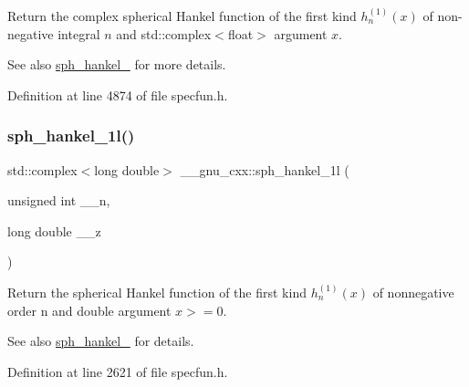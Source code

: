Return the complex spherical Hankel function of the first kind $ h^{(1)}_n(x) $ of non-\/negative integral $ n $ and {\ttfamily std\+::complex$<$float$>$} argument $ x $.

\begin{DoxySeeAlso}{See also}
\hyperlink{group__gnu__math__spec__func_ga4424f565fb224ab88b177beb65d08305}{sph\+\_\+hankel\+\_} for more details. 
\end{DoxySeeAlso}


Definition at line 4874 of file specfun.\+h.

\mbox{\label{group__gnu__math__spec__func_ga6e77fd5cddfbd57d9120b20fc6c30e6f}} 
\subsubsection{\texorpdfstring{sph\+\_\+hankel\+\_\+1l()}{sph\_hankel\_1l()}\hspace{0.1cm}{\footnotesize\ttfamily [1/2]}}
{\footnotesize\ttfamily std\+::complex$<$long double$>$ \+\_\+\+\_\+gnu\+\_\+cxx\+::sph\+\_\+hankel\+\_\+1l (\begin{DoxyParamCaption}\item[{unsigned int}]{\+\_\+\+\_\+n,  }\item[{long double}]{\+\_\+\+\_\+z }\end{DoxyParamCaption})\hspace{0.3cm}{\ttfamily [inline]}}

Return the spherical Hankel function of the first kind $ h^{(1)}_n(x) $ of nonnegative order n and { double} argument $ x >= 0 $.

\begin{DoxySeeAlso}{See also}
\hyperlink{group__gnu__math__spec__func_ga4424f565fb224ab88b177beb65d08305}{sph\+\_\+hankel\+\_} for details. 
\end{DoxySeeAlso}


Definition at line 2621 of file specfun.\+h.

\mbox{\label{group__gnu__math__spec__func_ga3e9d889d8f2e4792e892b12b1f5948b9}} 
